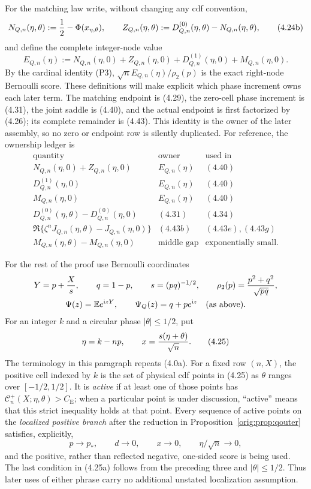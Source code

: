 \documentclass[11pt,a4paper]{article}
\numberwithin{equation}{section}
\theoremstyle{definition}
\theoremstyle{remark}
\newcommand{\E}{\mathbb E}
\newcommand{\ii}{\mathrm i}
\newcommand{\CE}{C_{\mathrm E}}
\begin{document}
For the matching law write, without changing any cdf convention,
\[
 N_{Q,n}(\eta,\theta):={1\over2}-\Phi(x_{\eta,\theta}),\qquad
 Z_{Q,n}(\eta,\theta):=D^{(0)}_{Q,n}(\eta,\theta)
                         -N_{Q,n}(\eta,\theta),        \tag{4.24b}
\]
and define the complete integer-node value
\[
 E_{Q,n}(\eta):=N_{Q,n}(\eta,0)+Z_{Q,n}(\eta,0)
       +D^{(1)}_{Q,n}(\eta,0)+M_{Q,n}(\eta,0).         \tag{4.24c}
\]
By the cardinal identity (P3),
$\sqrt nE_{Q,n}(\eta)/\rho_2(p)$ is the exact right-node Bernoulli score.
These definitions will make explicit which phase increment owns
each later term.
The matching endpoint is (4.29), the zero-cell phase increment is (4.31),
the joint saddle is (4.40), and the actual endpoint is first factorized by
(4.26); its complete remainder is (4.43).  This identity is the owner of
the later assembly, so no zero or endpoint row is silently duplicated.
For reference, the ownership ledger is
\[
\begin{array}{c|c|c}
\text{quantity}&\text{owner}&\text{used in}\\ \hline
N_{Q,n}(\eta,0)+Z_{Q,n}(\eta,0)&E_{Q,n}(\eta)&(4.40)\\
D^{(1)}_{Q,n}(\eta,0)&E_{Q,n}(\eta)&(4.40)\\
M_{Q,n}(\eta,0)&E_{Q,n}(\eta)&(4.40)\\
D^{(0)}_{Q,n}(\eta,\theta)-D^{(0)}_{Q,n}(\eta,0)&(4.31)&(4.34)\\
\Re\{\zeta^nJ_{Q,n}(\eta,\theta)-J_{Q,n}(\eta,0)\}&(4.43b)&(4.43e),(4.43g)\\
M_{Q,n}(\eta,\theta)-M_{Q,n}(\eta,0)&\text{middle gap}&\text{exponentially small}.
\end{array}                                                   \tag{4.24d}
\]

For the rest of the proof use Bernoulli coordinates
\[
 \begin{gathered}
 Y=p+{X\over s},\qquad q=1-p,\qquad s=(pq)^{-1/2},\qquad
 \rho_2(p)={p^2+q^2\over\sqrt{pq}},\\
 \Psi(z)=\E e^{\ii zY},\qquad \Psi_Q(z)=q+pe^{\ii z}
 \quad\text{(as above)}.
 \end{gathered}
\]
For an integer $k$ and a circular phase $|\theta|\le1/2$, put
\[
 \eta=k-np,\qquad x={s(\eta+\theta)\over\sqrt n}.       \tag{4.25}
\]
The terminology in this paragraph repeats (4.0a).  For a fixed row
$(n,X)$, the positive cell indexed by $k$ is the set of physical cdf
points in (4.25) as $\theta$ ranges over $[-1/2,1/2]$.  It is
\emph{active} if at least one of those points has
$\mathcal C_n^+(X;\eta,\theta)>\CE$; when a particular point is under
discussion, ``active'' means that this strict inequality holds at that
point.  Every sequence of active points on the
\emph{localized positive branch} after the reduction in
Proposition~\ref{orig:prop:qouter} satisfies, explicitly,
\[
 p\to p_*,\qquad d\to0,\qquad x\to0,\qquad
 \eta/\sqrt n\to0,                                    \tag{4.25a}
\]
and the positive, rather than reflected negative, one-sided score is being
used.  The last condition in (4.25a) follows from the preceding three and
$|\theta|\le1/2$.  Thus later uses of either phrase carry no additional
unstated localization assumption.
\end{document}
